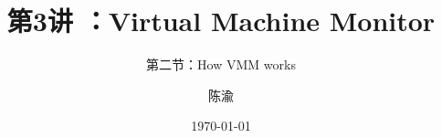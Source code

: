 


\title[第3讲]{第3讲 ：Virtual Machine Monitor} %
\subtitle{第二节：How VMM works}
\author{陈渝} %
\date{\today} %




\begin{frame}
\titlepage %
\end{frame}

%
%

